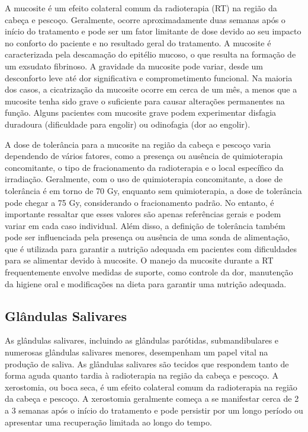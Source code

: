 \documentclass[11pt,a4paper]{article}
\begin{document}
	A mucosite é um efeito colateral comum da radioterapia (RT) na região da cabeça e pescoço. Geralmente, ocorre aproximadamente duas semanas após o início do tratamento e pode ser um fator limitante de dose devido ao seu impacto no conforto do paciente e no resultado geral do tratamento. A mucosite é caracterizada pela descamação do epitélio mucoso, o que resulta na formação de um exsudato fibrinoso. A gravidade da mucosite pode variar, desde um desconforto leve até dor significativa e comprometimento funcional. Na maioria dos casos, a cicatrização da mucosite ocorre em cerca de um mês, a menos que a mucosite tenha sido grave o suficiente para causar alterações permanentes na função. Alguns pacientes com mucosite grave podem experimentar disfagia duradoura (dificuldade para engolir) ou odinofagia (dor ao engolir).

	A dose de tolerância para a mucosite na região da cabeça e pescoço varia dependendo de vários fatores, como a presença ou ausência de quimioterapia concomitante, o tipo de fracionamento da radioterapia e o local específico da irradiação. Geralmente, com o uso de quimioterapia concomitante, a dose de tolerância é em torno de 70 Gy, enquanto sem quimioterapia, a dose de tolerância pode chegar a 75 Gy, considerando o fracionamento padrão. No entanto, é importante ressaltar que esses valores são apenas referências gerais e podem variar em cada caso individual. Além disso, a definição de tolerância também pode ser influenciada pela presença ou ausência de uma sonda de alimentação, que é utilizada para garantir a nutrição adequada em pacientes com dificuldades para se alimentar devido à mucosite. O manejo da mucosite durante a RT frequentemente envolve medidas de suporte, como controle da dor, manutenção da higiene oral e modificações na dieta para garantir uma nutrição adequada.

\subsection*{Glândulas Salivares}


	As glândulas salivares, incluindo as glândulas parótidas, submandibulares e numerosas glândulas salivares menores, desempenham um papel vital na produção de saliva. As glândulas salivares são tecidos que respondem tanto de forma aguda quanto tardia à radioterapia na região da cabeça e pescoço. A xerostomia, ou boca seca, é um efeito colateral comum  da radioterapia na região da cabeça e pescoço. A xerostomia geralmente começa a se manifestar cerca de 2 a 3 semanas após o início do tratamento e pode persistir por um longo período ou apresentar uma recuperação limitada ao longo do tempo.
\end{document}
